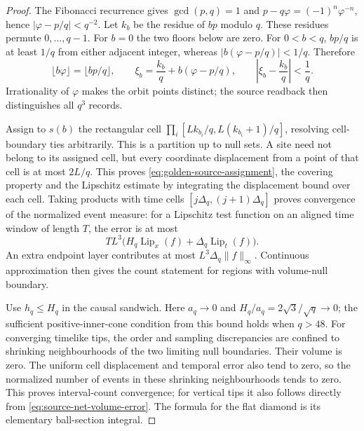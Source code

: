 \begin{proof}
The Fibonacci recurrence gives $\gcd(p,q)=1$ and
$p-q\varphi=(-1)^n\varphi^{-n}$, hence
$|\varphi-p/q|<q^{-2}$. Let $k_b$ be the residue of $bp$ modulo $q$.
These residues permute $0,\ldots,q-1$. For $b=0$ the two floors below
are zero. For $0<b<q$, $bp/q$ is at least $1/q$ from either adjacent
integer, whereas $|b(\varphi-p/q)|<1/q$. Therefore
\[
 \lfloor b\varphi\rfloor=\lfloor bp/q\rfloor,\qquad
 \xi_b=\frac{k_b}{q}+b(\varphi-p/q),\qquad
 \left|\xi_b-\frac{k_b}{q}\right|<\frac1q.
\]
Irrationality of $\varphi$ makes the orbit points distinct; the source
readback then distinguishes all $q^3$ records.

Assign to $s(b)$ the rectangular cell
$\prod_i[Lk_{b_i}/q,L(k_{b_i}+1)/q]$, resolving cell-boundary ties
arbitrarily. This is a partition up to null sets. A site need not belong
to its assigned cell, but every coordinate displacement from a point of
that cell is at most $2L/q$. This proves
\eqref{eq:golden-source-assignment}, the covering property and the
Lipschitz estimate by integrating the displacement bound over each cell.
Taking products with time cells $[j\Delta_q,(j+1)\Delta_q]$ proves
convergence of the normalized event measure: for a Lipschitz test function
on an aligned time window of length $T$, the error is at most
\[
 TL^3\bigl(H_q\operatorname{Lip}_x(f)
               +\Delta_q\operatorname{Lip}_t(f)\bigr).
\]
An extra endpoint layer contributes at most
$L^3\Delta_q\|f\|_\infty$. Continuous approximation then gives the
count statement for regions with volume-null boundary.

Use $h_q\leq H_q$ in the causal sandwich.
Here $a_q\to0$ and $H_q/a_q=2\sqrt3/\sqrt q\to0$; the sufficient
positive-inner-cone condition from this bound holds when $q>48$.
For converging timelike tips, the order and sampling discrepancies are
confined to shrinking neighbourhoods of the two limiting null boundaries.
Their volume is zero. The uniform cell displacement and temporal error
also tend to zero, so the normalized number of events in these shrinking
neighbourhoods tends to zero. This proves interval-count convergence;
for vertical tips it also follows directly from
\eqref{eq:source-net-volume-error}. The formula for the flat diamond is
its elementary ball-section integral.
\end{proof}

